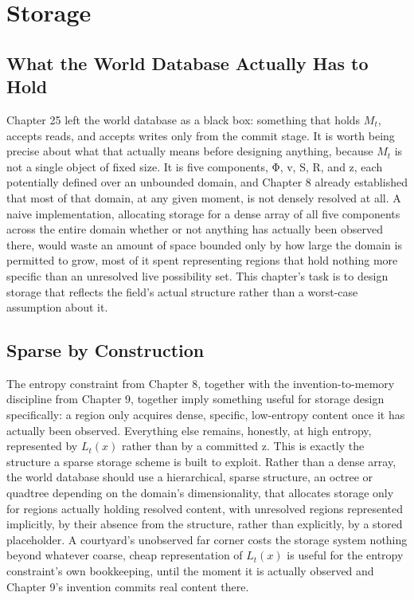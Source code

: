 \chapter{Storage}

\section{What the World Database Actually Has to Hold}

Chapter 25 left the world database as a black box: something that holds \(M_t\), accepts reads, and accepts writes only from the commit stage. It is worth being precise about what that actually means before designing anything, because \(M_t\) is not a single object of fixed size. It is five components, Φ, v, S, R, and z, each potentially defined over an unbounded domain, and Chapter 8 already established that most of that domain, at any given moment, is not densely resolved at all. A naive implementation, allocating storage for a dense array of all five components across the entire domain whether or not anything has actually been observed there, would waste an amount of space bounded only by how large the domain is permitted to grow, most of it spent representing regions that hold nothing more specific than an unresolved live possibility set. This chapter's task is to design storage that reflects the field's actual structure rather than a worst-case assumption about it.

\section{Sparse by Construction}

The entropy constraint from Chapter 8, together with the invention-to-memory discipline from Chapter 9, together imply something useful for storage design specifically: a region only acquires dense, specific, low-entropy content once it has actually been observed. Everything else remains, honestly, at high entropy, represented by \(L_t(x)\) rather than by a committed z. This is exactly the structure a sparse storage scheme is built to exploit. Rather than a dense array, the world database should use a hierarchical, sparse structure, an octree or quadtree depending on the domain's dimensionality, that allocates storage only for regions actually holding resolved content, with unresolved regions represented implicitly, by their absence from the structure, rather than explicitly, by a stored placeholder. A courtyard's unobserved far corner costs the storage system nothing beyond whatever coarse, cheap representation of \(L_t(x)\) is useful for the entropy constraint's own bookkeeping, until the moment it is actually observed and Chapter 9's invention commits real content there.

